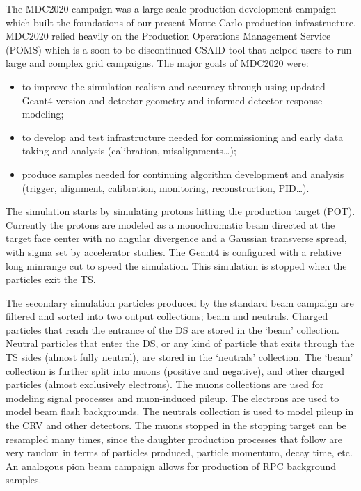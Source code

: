 The MDC2020 campaign was a large scale production development campaign which built the foundations of our present Monte Carlo production infrastructure. MDC2020 relied heavily on the Production Operations Management Service (POMS) \cite{Mengel:2020wev} which is a soon to be discontinued CSAID tool that helped users to run large and complex grid campaigns. The major goals of MDC2020 were:
\begin{itemize}
    \item to improve the simulation realism and accuracy through using updated Geant4 version and detector geometry and informed detector response modeling;
    \item to develop and test infrastructure needed for commissioning and early data taking and analysis (calibration, misalignments…);
    \item produce samples needed for continuing algorithm development and analysis (trigger, alignment, calibration, monitoring, reconstruction, PID…).
\end{itemize}

The simulation starts by simulating protons hitting the production target (POT).  Currently the protons are modeled as a monochromatic beam directed at the target face center with no angular divergence and a Gaussian transverse spread, with sigma set by accelerator studies. The Geant4 is configured with a relative long minrange cut to speed the simulation. This simulation is stopped when the particles exit the TS.

The secondary simulation particles produced by the standard beam campaign are filtered and sorted into two output collections; beam and neutrals. Charged particles that reach the entrance of the DS are stored in the ‘beam’ collection.  Neutral particles that enter the DS, or any kind of particle that exits through the TS sides (almost fully neutral), are stored in the ‘neutrals’ collection.  The ‘beam’ collection is further split into muons (positive and negative), and other charged particles (almost exclusively electrons).  The muons collections are used for modeling signal processes and muon-induced pileup.  The electrons are used to model beam flash backgrounds. The neutrals collection is used to model pileup in the CRV and other detectors.  The muons stopped in the stopping target can be resampled many times, since the daughter production processes that follow are very random in terms of particles produced, particle momentum, decay time, etc.  An analogous pion beam campaign allows for production of RPC background samples.

